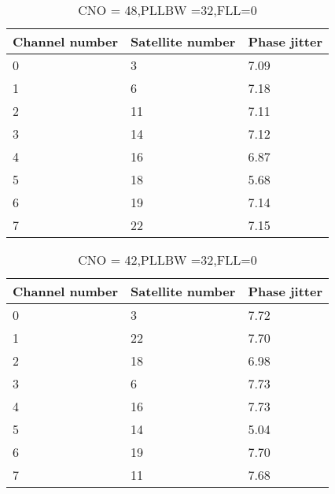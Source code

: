 \begin{table}[!htb]
\centering
\begin{tabular}{|l|l|l|}
\hline
\rowcolor[HTML]{C0C0C0} 
Channel number & Satellite number & Phase jitter       \\ \hline
0              & 3                & 7.09 \\ \hline
\rowcolor[HTML]{EFEFEF} 
1              & 6                & 7.18 \\ \hline
2              & 11               & 7.11 \\ \hline
\rowcolor[HTML]{EFEFEF} 
3              & 14               & 7.12 \\ \hline
4              & 16               & 6.87 \\ \hline
\rowcolor[HTML]{EFEFEF} 
5              & 18               & 5.68 \\ \hline
6              & 19               & 7.14  \\ \hline
\rowcolor[HTML]{EFEFEF} 
7              & 22               & 7.15 \\ \hline
\end{tabular}
\caption{CNO = 48,PLLBW =32,FLL=0}
\label{my-label}
\end{table}


\begin{table}[!htb]
\centering
\begin{tabular}{|l|l|l|}
\hline
\rowcolor[HTML]{C0C0C0} 
Channel number & Satellite number & Phase jitter       \\ \hline
0              & 3                & 7.72 \\ \hline
\rowcolor[HTML]{EFEFEF} 
1              & 22               & 7.70 \\ \hline
2              & 18               & 6.98\\ \hline
\rowcolor[HTML]{EFEFEF} 
3              & 6                & 7.73 \\ \hline
4              & 16               & 7.73 \\ \hline
\rowcolor[HTML]{EFEFEF} 
5              & 14               & 5.04 \\ \hline
6              & 19               & 7.70 \\ \hline
\rowcolor[HTML]{EFEFEF} 
7              & 11               & 7.68 \\ \hline
\end{tabular}
\caption{CNO = 42,PLLBW =32,FLL=0}
\label{my-label}
\end{table}

